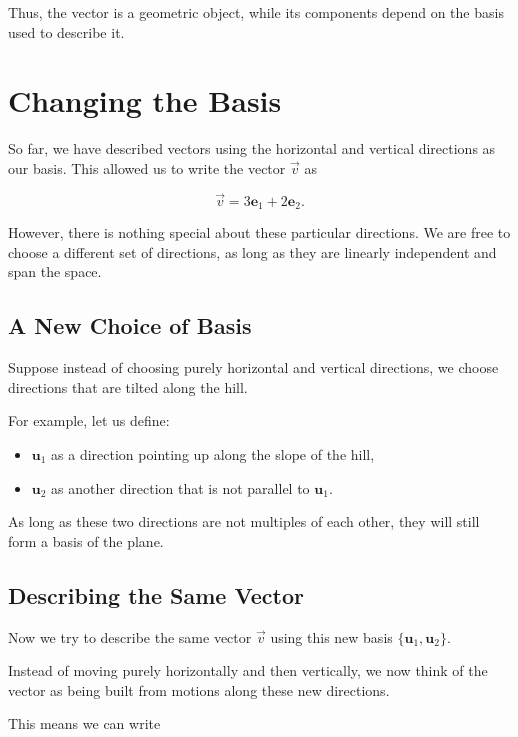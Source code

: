 \documentclass[11pt,openany]{book}
\theoremstyle{definition}
\begin{document}
\medskip

Thus, the vector is a geometric object, while its components depend on the basis used to describe it.


\section{Changing the Basis}

So far, we have described vectors using the horizontal and vertical directions as our basis.
This allowed us to write the vector $\vec{v}$ as

\[
\vec{v} = 3\mathbf{e}_1 + 2\mathbf{e}_2.
\]

However, there is nothing special about these particular directions.
We are free to choose a different set of directions, as long as they are linearly independent and span the space.

\subsection{A New Choice of Basis}

Suppose instead of choosing purely horizontal and vertical directions,
we choose directions that are tilted along the hill.

For example, let us define:

\begin{itemize}
  \item $\mathbf{u}_1$ as a direction pointing up along the slope of the hill,
  \item $\mathbf{u}_2$ as another direction that is not parallel to $\mathbf{u}_1$.
\end{itemize}

As long as these two directions are not multiples of each other, they will still form a basis of the plane.

\medskip

\subsection{Describing the Same Vector}

Now we try to describe the same vector $\vec{v}$ using this new basis $\{\mathbf{u}_1, \mathbf{u}_2\}$.

Instead of moving purely horizontally and then vertically,
we now think of the vector as being built from motions along these new directions.

This means we can write
\end{document}
